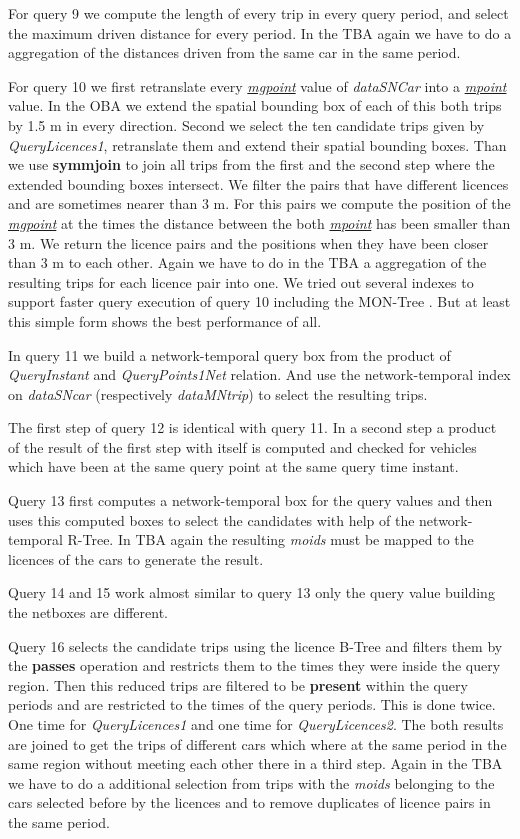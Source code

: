 \documentclass[a4paper]{article}
\newcommand{\op}[1]{\textbf{#1}}
\newcommand{\var}[1]{\textsl{#1}}
\newcommand{\dt}[1]{\textsl{\underline{#1}}}
\begin{document}
{For query 9 we compute the length of every trip in every query period, and select the maximum driven distance for every period. In the TBA again we have to do a aggregation of the distances driven from the same car in the same period.

For query 10 we first retranslate every \dt{mgpoint} value of \var{dataSNCar} into a \dt{mpoint} value. In the OBA we extend the spatial bounding box of each of this both trips by 1.5 m in every direction. Second we select the ten candidate trips given by \var{QueryLicences1}, retranslate them and extend their spatial bounding boxes. Than we use \op{symmjoin} to join all trips from the first and the second step where the extended bounding boxes intersect. We filter the pairs that have different licences and are sometimes nearer than 3 m. For this pairs we compute the position of the \dt{mgpoint} at the times the distance between the both \dt{mpoint} has been smaller than 3 m. We return the licence pairs and the positions when they have been closer than 3 m to each other. Again we have to do in the TBA a aggregation of the resulting trips for each licence pair into one. We tried out several indexes to support faster query execution of query 10 including the MON-Tree \cite{MONTree}. But at least this simple form shows the best performance of all.

In query 11 we build a network-temporal query box from the product of \var{QueryInstant} and \var{QueryPoints1Net} relation. And use the network-temporal index on \var{dataSNcar} (respectively \var{dataMNtrip}) to select the resulting trips.

The first step of query 12 is identical with query 11. In a second step a product of the result of the first step with itself is computed and checked for vehicles which have been at the same query point at the same query time instant.

Query 13 first computes a network-temporal box for the query values and then uses this computed boxes to select the candidates with help of the network-temporal R-Tree. In TBA again the resulting \var{moids} must be mapped to the licences of the cars to generate the result.

Query 14 and 15 work almost similar to query 13 only the query value building the netboxes are different.

Query 16 selects the candidate trips using the licence B-Tree and filters them by the \op{passes} operation and restricts them to the times they were inside the query region. Then this reduced trips are filtered to be \op{present} within the query periods and are restricted to the times of the query periods. This is done twice. One time for \var{QueryLicences1} and one time for \var{QueryLicences2}. The both results are joined to get the trips of different cars which where at the same period in the same region without meeting each other there in a third step. Again in the TBA we have to do a additional selection from trips with the \var{moids} belonging to the cars selected before by the licences and to remove duplicates of licence pairs in the same period.

}
\end{document}
